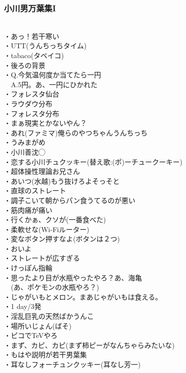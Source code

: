 \subsubsection{小川男万葉集I} 
　\\
・あっ！若干寒い\\
・UTT(うんちっちタイム)\\
・tabaco(タベイコ)\\
・後ろの背景\\
・Q.今気温何度か当てたら一円\\
　A.5円。あ、一円にひかれた\\
・フォレスタ仙台\\
・ラウダウ分布\\
・フォレスタ分布\\
・まぁ現実とかないやん？\\
・あれ(ファミマ)俺らのやつちゃんうんちっち\\
・うみまがめ\\
・小川善沈◯\\
・恋する小川チュクッキー(替え歌:(ポ)ーチュークーキー)\\
・超体操性理論お兄さん\\
・あいつ(水越)もう抜けろよそっそと\\
・直球のストレート\\
・調子こいて朝からパン食うてるのが悪い\\
・筋肉痛が痛い\\
・行くかぁ、クソが(一番食べた)\\
・柔軟せな(Wi-Fiルーター)\\
・変なボタン押すなよ(ボタンは２つ)\\
・おいよ\\
・ストレートが広すぎる\\
・けっぽん指輪\\
・思ったより目が水瓶やったやろ？あ、海亀\\
　(あ、ポケモンの水瓶やろ？)\\
・じゃがいもとメロン。まあじゃがいもは食える。\\
・1 day/3発\\
・淫乱巨乳の天然ばかうんこ\\
・場所いじょん(ばそ)\\
・ピコでTeVやろ\\
・まず、カピ、カピ(まず柿ピーがなんちゃらみたいな)\\
・もはや説明が若干男葉集\\
・耳なしフォーチュンクッキー(耳なし芳一)\\
